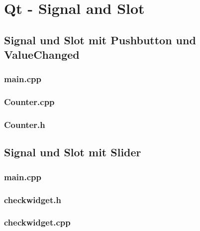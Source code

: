 

\section{Qt - Signal and Slot}
\subsection{Signal und Slot mit Pushbutton und ValueChanged}
\begin{minipage}[t]{0.5\textwidth}
\subsubsection{main.cpp}

\end{minipage}\hfill
\begin{minipage}[t]{0.47\textwidth}
\subsubsection{Counter.cpp}

\subsubsection{Counter.h}

\end{minipage}


\subsection{Signal und Slot mit Slider}
\begin{minipage}[t]{0.5\textwidth}
\subsubsection{main.cpp}

\end{minipage}\hfill
\begin{minipage}[t]{0.47\textwidth}
\subsubsection{checkwidget.h}

\end{minipage}
\subsubsection{checkwidget.cpp}


